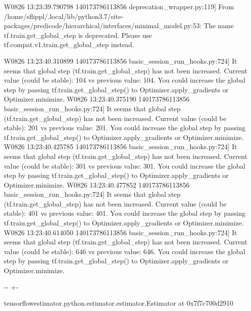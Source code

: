 \documentclass[letterpaper,10pt,english]{sphinxmanual}
\newlength\nbsphinxcodecellspacing
\begin{document}
{\begin{sphinxVerbatim}[commandchars=\\\{\}]
W0826 13:23:39.790798 140173786113856 deprecation\_wrapper.py:119] From /home/sflippl/.local/lib/python3.7/site-packages/predicode/hierarchical/interfaces/minimal\_model.py:53: The name tf.train.get\_global\_step is deprecated. Please use tf.compat.v1.train.get\_global\_step instead.

W0826 13:23:40.310899 140173786113856 basic\_session\_run\_hooks.py:724] It seems that global step (tf.train.get\_global\_step) has not been increased. Current value (could be stable): 104 vs previous value: 104. You could increase the global step by passing tf.train.get\_global\_step() to Optimizer.apply\_gradients or Optimizer.minimize.
W0826 13:23:40.375190 140173786113856 basic\_session\_run\_hooks.py:724] It seems that global step (tf.train.get\_global\_step) has not been increased. Current value (could be stable): 201 vs previous value: 201. You could increase the global step by passing tf.train.get\_global\_step() to Optimizer.apply\_gradients or Optimizer.minimize.
W0826 13:23:40.425785 140173786113856 basic\_session\_run\_hooks.py:724] It seems that global step (tf.train.get\_global\_step) has not been increased. Current value (could be stable): 301 vs previous value: 301. You could increase the global step by passing tf.train.get\_global\_step() to Optimizer.apply\_gradients or Optimizer.minimize.
W0826 13:23:40.477852 140173786113856 basic\_session\_run\_hooks.py:724] It seems that global step (tf.train.get\_global\_step) has not been increased. Current value (could be stable): 401 vs previous value: 401. You could increase the global step by passing tf.train.get\_global\_step() to Optimizer.apply\_gradients or Optimizer.minimize.
W0826 13:23:40.614050 140173786113856 basic\_session\_run\_hooks.py:724] It seems that global step (tf.train.get\_global\_step) has not been increased. Current value (could be stable): 646 vs previous value: 646. You could increase the global step by passing tf.train.get\_global\_step() to Optimizer.apply\_gradients or Optimizer.minimize.
\end{sphinxVerbatim}
}
\relax

{

\kern-\sphinxverbatimsmallskipamount\kern-\baselineskip
\kern+\FrameHeightAdjust\kern-\fboxrule
\vspace{\nbsphinxcodecellspacing}

\begin{sphinxVerbatim}[commandchars=\\\{\}]
\llap{\color{nbsphinxout}[4]:\,\hspace{\fboxrule}\hspace{\fboxsep}}\PYGZlt{}tensorflow\PYGZus{}estimator.python.estimator.estimator.Estimator at 0x7f7c700d2910\PYGZgt{}
\end{sphinxVerbatim}
}
\end{document}
